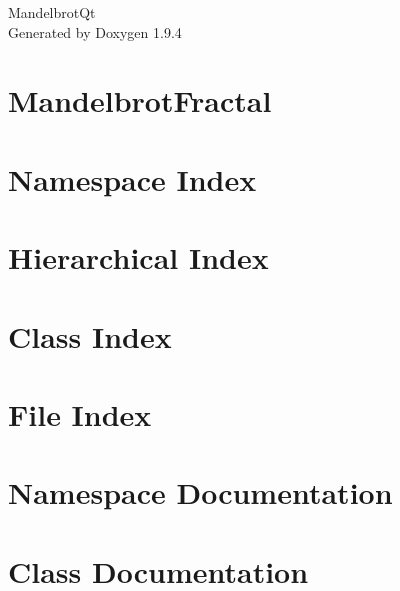 \documentclass[twoside]{book}
\newcommand{\+}{\discretionary{\mbox{\scriptsize$\hookleftarrow$}}{}{}}
\newcommand{\clearemptydoublepage}{%
    \newpage{\pagestyle{empty}\cleardoublepage}%
  }
\begin{document}
  \raggedbottom
    \hypersetup{pageanchor=false,
                bookmarksnumbered=true,
                pdfencoding=unicode
               }
  \begin{titlepage}
  \vspace*{7cm}
  \begin{center}%
  {\Large Mandelbrot\+Qt}\\
  \vspace*{1cm}
  {\large Generated by Doxygen 1.9.4}\\
  \end{center}
  \end{titlepage}
  \clearemptydoublepage
  \tableofcontents
  \clearemptydoublepage
  \hypersetup{pageanchor=true}
\chapter{Mandelbrot\+Fractal}
\label{md__r_e_a_d_m_e}

\chapter{Namespace Index}

\chapter{Hierarchical Index}

\chapter{Class Index}

\chapter{File Index}

\chapter{Namespace Documentation}

\chapter{Class Documentation}














\end{document}
